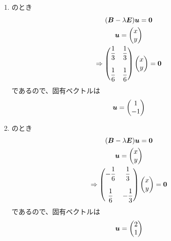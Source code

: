 \begin{ans*}
\begin{enumerate}[label=(\arabic*)]
    \begin{enumerate}[label=(\roman*)]
      \item {}のとき
      \begin{gather}
        (\bm{B} -\lambda\bm{E}){\bm{u}} = \bm{0} \\
        {\bm{u}} = \begin{pmatrix} x \\ y \end{pmatrix} \\
        \Rightarrow
        \begin{pmatrix}
          {\displaystyle\frac{1}{3}} & {\displaystyle\frac{1}{3}} \\&\\ {\displaystyle\frac{1}{6}} & {\displaystyle\frac{1}{6}}
        \end{pmatrix}
        \begin{pmatrix}
          x \\ y
        \end{pmatrix}
        =\bm{0}
      \end{gather}
      であるので、固有ベクトルは
      \begin{gather}
        {\bm{u}} = 
        \begin{pmatrix}
          1 \\ -1
        \end{pmatrix}
      \end{gather}
      \item {}のとき
      \begin{gather}
        (\bm{B} -\lambda\bm{E}){\bm{u}} = \bm{0} \\
        {\bm{u}} = \begin{pmatrix} x \\ y \end{pmatrix} \\
        \Rightarrow
        \begin{pmatrix}
          {\displaystyle-\frac{1}{6}} & {\displaystyle\frac{1}{3}} \\&\\ {\displaystyle\frac{1}{6}} & {\displaystyle -\frac{1}{3}}
        \end{pmatrix}
        \begin{pmatrix}
          x \\ y
        \end{pmatrix}
        =\bm{0}
      \end{gather}
      であるので、固有ベクトルは
      \begin{gather}
        {\bm{u}} = 
        \begin{pmatrix}
          2 \\ 1
        \end{pmatrix}
      \end{gather}
    \end{enumerate}


\end{enumerate}
\end{ans*}
